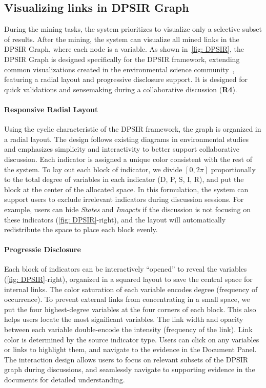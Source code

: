 \subsection{Visualizing links in DPSIR Graph}
During the mining tasks, the system prioritizes to visualize only a selective subset of results. After the mining, the system can visualize all mined links in the DPSIR Graph, where each node is a variable. 
As shown in~\autoref{fig: DPSIR}, the DPSIR Graph is designed specifically for the DPSIR framework, extending common visualizations created in the environmental science community~\cite{atkins2011dpsir}, featuring a radial layout and progressive disclosure support. It is designed for quick validations and sensemaking during a collaborative discussion (\textbf{R4}). 

\vspace*{-0.1cm}
\paragraph{Responsive Radial Layout} 
Using the cyclic characteristic of the DPSIR framework, the graph is organized in a radial layout. The design follows existing diagrams in environmental studies~\cite{atkins2011dpsir} and emphasizes simplicity and interactivity to better support collaborative discussion.
Each indicator is assigned a unique color consistent with the rest of the system. To lay out each block of indicator, we divide $[0, 2\pi]$ proportionally to the total degree of variables in each indicator (D, P, S, I, R), and put the block at the center of the allocated space. In this formulation, the system can support users to exclude irrelevant indicators during discussion sessions. 
For example, users can hide \textit{States} and \textit{Imapcts} if the discussion is not focusing on these indicators (\autoref{fig: DPSIR}-right), and the layout will automatically redistribute the space to place each block evenly.

\vspace*{-0.1cm}
\paragraph{Progressie Disclosure} 
 Each block of indicators can be interactively ``opened'' to reveal the variables (\autoref{fig: DPSIR}-right), organized in a squared layout to save the central space for internal links. The color saturation of each variable encodes degree (frequency of occurrence). To prevent external links from concentrating in a small space, we put the four highest-degree variables at the four corners of each block. This also helps users locate the most significant variables. The link width and opacity between each variable double-encode the intensity (frequency of the link). Link color is determined by the source indicator type.
  Users can click on any variables or links to highlight them, and navigate to the evidence in the Document Panel.
 The interaction design allows users to focus on relevant subsets of the DPSIR graph during discussions, 
 and seamlessly navigate to supporting evidence in the documents for detailed understanding. 
